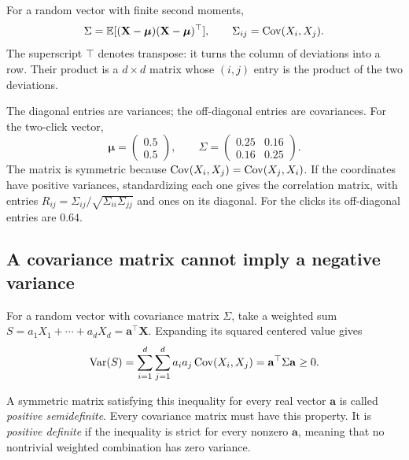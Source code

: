 \begin{definition}
For a random vector with finite second moments,
\begin{equation}
  \Sigma=\mathbb{E}[(\mathbf X-\boldsymbol\mu)
                    (\mathbf X-\boldsymbol\mu)^\top],
  \qquad \Sigma_{ij}=\operatorname{Cov}(X_i,X_j).
  \label{eq:covariance-matrix}
\end{equation}
The superscript \(\top\) denotes transpose: it turns the column of
deviations into a row. Their product is a \(d\times d\) matrix whose
\((i,j)\) entry is the product of the two deviations.
\end{definition}

The diagonal entries are variances; the off-diagonal entries are
covariances. For the two-click vector,
\[
  \boldsymbol\mu=\begin{pmatrix}0.5\\0.5\end{pmatrix},\qquad
  \Sigma=\begin{pmatrix}0.25&0.16\\0.16&0.25\end{pmatrix}.
\]
The matrix is symmetric because \(\operatorname{Cov}(X_i,X_j)=\operatorname{Cov}(X_j,X_i)\).
If the coordinates have positive variances, standardizing each one
gives the correlation matrix, with entries
\(R_{ij}=\Sigma_{ij}/\sqrt{\Sigma_{ii}\Sigma_{jj}}\) and ones on its
diagonal. For the clicks its off-diagonal entries are \(0.64\).

\subsection{A covariance matrix cannot imply a negative variance}

\begin{result}
For a random vector with covariance matrix \(\Sigma\),
take a weighted sum \(S=a_1X_1+\cdots+a_dX_d=\mathbf a^\top\mathbf X\).
Expanding its squared centered value gives
\begin{equation}
  \operatorname{Var}(S)=\sum_{i=1}^d\sum_{j=1}^d
            a_i a_j\operatorname{Cov}(X_i,X_j)
         =\mathbf a^\top\Sigma\mathbf a\ge0.
  \label{eq:variance-quadratic-form}
\end{equation}
\end{result}
A symmetric matrix satisfying this inequality for every real vector
\(\mathbf a\) is called \emph{positive semidefinite}. Every covariance
matrix must have this property. It is \emph{positive definite} if the
inequality is strict for every nonzero \(\mathbf a\), meaning that no
nontrivial weighted combination has zero variance.

